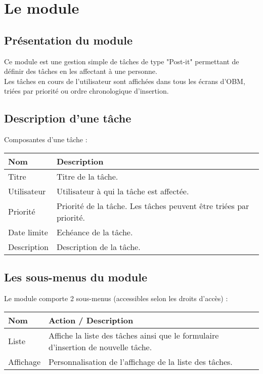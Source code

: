 
\clearpage
\section{Le module \todo}

\subsection{Présentation du module \todo}

Ce module est une gestion simple de tâches de type "Post-it" permettant de définir des tâches en les affectant à une personne.\\

Les tâches en cours de l'utilisateur sont affichées dans tous les écrans d'OBM, triées par priorité ou ordre chronologique d'insertion.

\subsection{Description d'une tâche}

Composantes d'une tâche :\\

\begin{tabular}{|p{3cm}|p{10cm}|}
\hline
\textbf{Nom} & \textbf{Description} \\
\hline
Titre & Titre de la tâche.\\
\hline
Utilisateur & Utilisateur à qui la tâche est affectée.\\
\hline
Priorité & Priorité de la tâche. Les tâches peuvent être triées par priorité.\\
\hline
Date limite & Echéance de la tâche.\\
\hline
Description & Description de la tâche.\\
\hline
\end{tabular}
\vspace{0.3cm}


\subsection{Les sous-menus du module \todo}

Le module \todo comporte 2 sous-menus (accessibles selon les droits d'accès) :\\

\begin{tabular}{|p{2.5cm}|p{9.5cm}|}
\hline
\textbf{Nom} & \textbf{Action / Description} \\
\hline
Liste & Affiche la liste des tâches ainsi que le formulaire d'insertion de nouvelle  tâche.\\
\hline
Affichage & Personnalisation de l'affichage de la liste des tâches.\\
\hline
\end{tabular}


